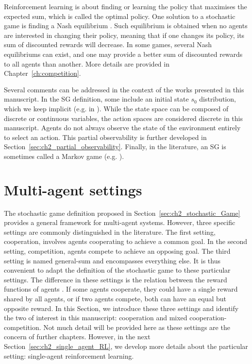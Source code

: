 Reinforcement learning is about finding or learning the policy that maximises the expected sum, which is called the optimal policy.
One solution to a stochastic game is finding a Nash equilibrium \citep{nash1950equilibrium}.
Such equilibrium is obtained when no agents are interested in changing their policy, meaning that if one changes its policy, its sum of discounted rewards will decrease.
In some games, several Nash equilibriums can exist, and one may provide a better sum of discounted rewards to all agents than another.
More details are provided in Chapter~\ref{ch:competition}.

Several comments can be addressed in the context of the works presented in this manuscript.
In the SG definition, some include an initial state $s_0$ distribution, which we keep implicit (e.g. in \citep{marl-book}).
While the state space can be composed of discrete or continuous variables, the action spaces are considered discrete in this manuscript.
Agents do not always observe the state of the environment entirely to select an action.
This partial observability is further developed in Section~\ref{sec:ch2_partial_observability}.
Finally, in the literature, an SG is sometimes called a Markov game (e.g. \citep{MarkovGames}).

\section{Multi-agent settings} 
\label{sec:ch2_multi_agent_settings}
The stochastic game definition proposed in Section~\ref{sec:ch2_stochastic_Game} provides a general framework for multi-agent systems.
However, three specific settings are commonly distinguished in the literature.
The first setting, cooperation, involves agents cooperating to achieve a common goal.
In the second setting, competition, agents compete to achieve an opposing goal.
The third setting is named general-sum and encompasses everything else.
It is thus convenient to adapt the definition of the stochastic game to these particular settings.
The difference in these settings is the relation between the reward functions of agents \citep{marl-book}.
If some agents cooperate, they could have a single reward shared by all agents, or if two agents compete, both can have an equal but opposite reward.
In this Section, we introduce these three settings and identify the two of interest in this manuscript: cooperation and mixed cooperation-competition.
Not much detail will be provided here as these settings are the concern of further chapters.
However, in the next Section~\ref{sec:ch2_single_agent_RL}, we develop more details about the particular setting: single-agent reinforcement learning.

